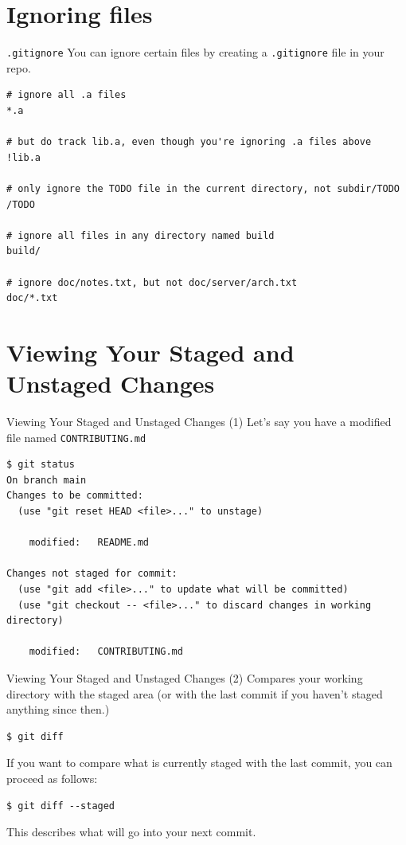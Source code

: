 \documentclass[handout]{beamer}
\begin{document}
\section{Ignoring files}

\begin{frame}[fragile]{\texttt{.gitignore}}
You can ignore certain files by creating a \texttt{.gitignore} file in your repo. 
\begin{lstlisting}
# ignore all .a files
*.a

# but do track lib.a, even though you're ignoring .a files above
!lib.a

# only ignore the TODO file in the current directory, not subdir/TODO
/TODO

# ignore all files in any directory named build
build/

# ignore doc/notes.txt, but not doc/server/arch.txt
doc/*.txt
\end{lstlisting}
\end{frame}

\section{Viewing Your Staged and Unstaged Changes}

\begin{frame}[fragile]{Viewing Your Staged and Unstaged Changes (1)}
Let's say you have a modified file named \texttt{CONTRIBUTING.md}
\begin{lstlisting}
$ git status
On branch main
Changes to be committed:
  (use "git reset HEAD <file>..." to unstage)

    modified:   README.md

Changes not staged for commit:
  (use "git add <file>..." to update what will be committed)
  (use "git checkout -- <file>..." to discard changes in working directory)

    modified:   CONTRIBUTING.md
\end{lstlisting}
\end{frame}

\begin{frame}[fragile]{Viewing Your Staged and Unstaged Changes (2)}
Compares your working directory with the staged area (or with the last commit if you haven't staged anything since then.)
\begin{lstlisting}
$ git diff
\end{lstlisting}
If you want to compare what is currently staged with the last commit, you can proceed as follows:
\begin{lstlisting}
$ git diff --staged
\end{lstlisting}
This describes what will go into your next commit. 
\end{frame}
\end{document}
